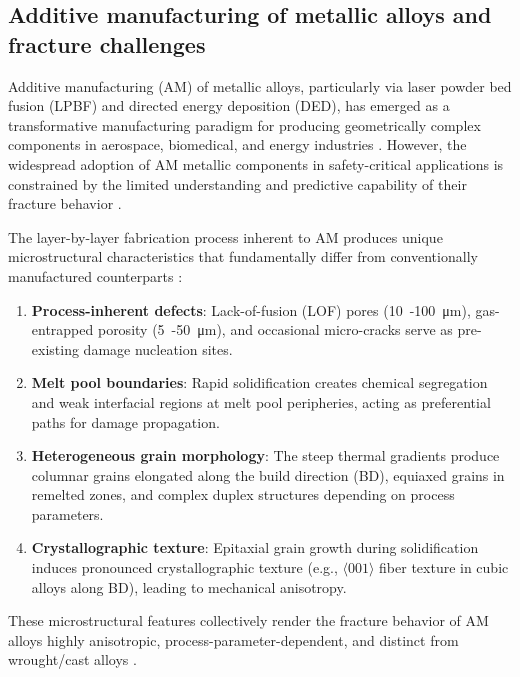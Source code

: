 \documentclass[12pt,a4paper,twocolumn]{article}
\begin{document}
\subsection{Additive manufacturing of metallic alloys and fracture challenges}

Additive manufacturing (AM) of metallic alloys, particularly via laser powder bed fusion (LPBF) and directed energy deposition (DED), has emerged as a transformative manufacturing paradigm for producing geometrically complex components in aerospace, biomedical, and energy industries \cite{debroy2018additive,herzog2016additive}. However, the widespread adoption of AM metallic components in safety-critical applications is constrained by the limited understanding and predictive capability of their fracture behavior \cite{seifi2017overview}.

The layer-by-layer fabrication process inherent to AM produces unique microstructural characteristics that fundamentally differ from conventionally manufactured counterparts \cite{thijs2010study,suryawanshi2017mechanical}:

\begin{enumerate}\def\labelenumi{(\roman{enumi})}
    \item \textbf{Process-inherent defects}: Lack-of-fusion (LOF) pores (\SI{10}{-}\SI{100}{\micro\meter}), gas-entrapped porosity (\SI{5}{-}\SI{50}{\micro\meter}), and occasional micro-cracks serve as pre-existing damage nucleation sites.
    \item \textbf{Melt pool boundaries}: Rapid solidification creates chemical segregation and weak interfacial regions at melt pool peripheries, acting as preferential paths for damage propagation.
    \item \textbf{Heterogeneous grain morphology}: The steep thermal gradients produce columnar grains elongated along the build direction (BD), equiaxed grains in remelted zones, and complex duplex structures depending on process parameters.
    \item \textbf{Crystallographic texture}: Epitaxial grain growth during solidification induces pronounced crystallographic texture (e.g., $\langle001\rangle$ fiber texture in cubic alloys along BD), leading to mechanical anisotropy.
\end{enumerate}

These microstructural features collectively render the fracture behavior of AM alloys highly anisotropic, process-parameter-dependent, and distinct from wrought/cast alloys \cite{carroll2015anisotropic,kok2018anisotropy}.
\end{document}
